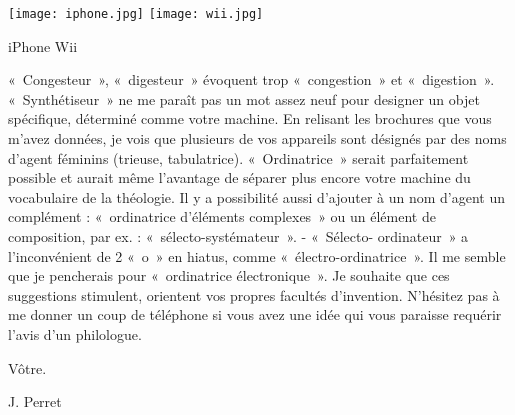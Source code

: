 {{\begin{fig}
{\begin{minipage}{7.5cm}
\texttt{[image: iphone.jpg]}\hfill
\texttt{[image: wii.jpg]}

\mbox{}\hfill iPhone \hfill Wii \hfill \mbox{}
\end{minipage}}
\end{fig}
}
«~Congesteur~», «~digesteur~» évoquent trop «~congestion~» et «~digestion~».
«~Synthé\-ti\-seur~» ne me
paraît pas un mot assez neuf pour designer un objet spécifique, déterminé comme votre machine.
En relisant les brochures que vous m'avez données, je vois que plusieurs de vos appareils sont
désignés par des noms d'agent féminins (trieuse, tabulatrice). «~Ordinatrice~» serait parfaitement
possible et aurait même l'avantage de séparer plus encore votre machine du vocabulaire de la
théologie.
Il y a possibilité aussi d'ajouter à un nom d'agent un complément : «~ordinatrice d'éléments
complexes~» ou un élément de composition, par ex. : «~sélecto-sys\-té\-ma\-teur~». - «~Sélecto-
ordinateur~» a l'inconvénient de 2 «~o~» en hiatus, comme «~électro-ordinatrice~».
Il me semble que je pencherais pour «~ordinatrice électroni\-que~». Je souhaite que ces suggestions
stimulent, orientent vos propres facultés d'invention. N'hésitez pas à me donner un coup de
téléphone si vous avez une idée qui vous paraisse requérir l'avis d'un philologue.

Vôtre.

J. Perret
}


\newpage
